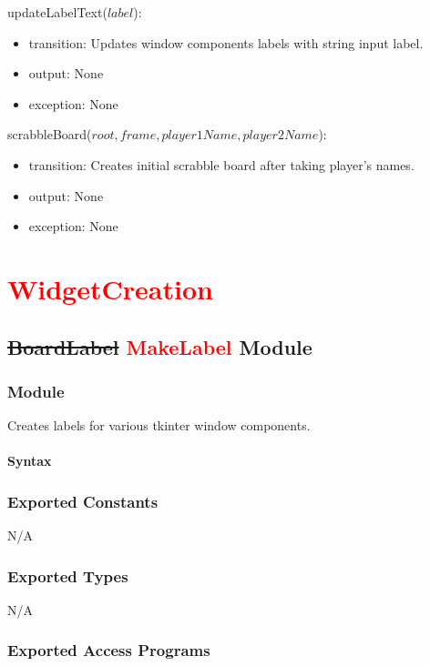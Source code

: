 \documentclass[12pt]{article}
\begin{document}
\noindent updateLabelText($label$):
\begin{itemize}
\item transition: Updates window components labels with string input label.
\item output: None
\item exception: None
\end{itemize}

\noindent scrabbleBoard($root, frame, player1Name, player2Name$):
\begin{itemize}
\item transition: Creates initial scrabble board after taking player's names.
\item output: None
\item exception: None
\end{itemize}

\newpage

\section*{\textcolor{red}{WidgetCreation}}

\subsection*{\sout{BoardLabel} \textcolor{red}{MakeLabel} Module}

\subsubsection*{Module}

Creates labels for various tkinter window components.

\paragraph*{Syntax}

\subsubsection*{Exported Constants}
N/A
\subsubsection*{Exported Types}

N/A

\subsubsection* {Exported Access Programs}
\end{document}
